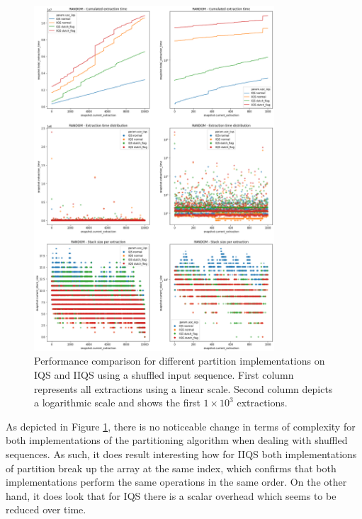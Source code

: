 \begin{figure}[!ht]
    \centering
    \includegraphics[width=0.8\textwidth]{./fragments/04_experimental_execution/images/02_basebenchmark_01_base_benchmark.png}
    \caption{Performance comparison for different partition implementations on IQS and IIQS using a shuffled input sequence. First column represents all extractions using a linear scale. Second column depicts a logarithmic scale and shows the first $1\times10^3$ extractions.}
    \label{FIG:PARTITION_SCHEME_01_SHUFFLED}
\end{figure}

As depicted in Figure \ref{FIG:PARTITION_SCHEME_01_SHUFFLED}, there is no noticeable change in terms of complexity for both implementations of the partitioning algorithm when dealing with shuffled sequences. As such, it does result interesting how for IIQS both implementations of partition break up the array at the same index, which confirms that both implementations perform the same operations in the same order. On the other hand, it does look that for IQS there is a scalar overhead which seems to be reduced over time. 

